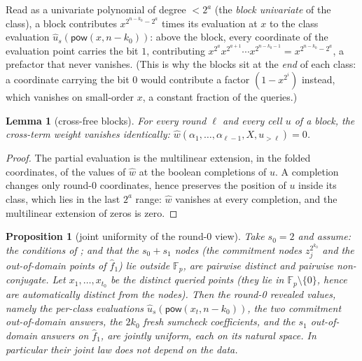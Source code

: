 \documentclass{article}
\newcommand{\Fp}{\mathbb{F}_p}
\newcommand{\pow}{\mathsf{pow}}
\newtheorem{lemma}[theorem]{Lemma}
\newtheorem{proposition}[theorem]{Proposition}
\theoremstyle{definition}
\begin{document}
Read as a univariate polynomial of degree $< 2^a$ (the \emph{block univariate} of the class), a block contributes $x^{2^{n - k_0} - 2^a}$ times its evaluation at $x$ to the class evaluation $\hat{u}_s(\pow(x, n - k_0))$: above the block, every coordinate of the evaluation point carries the bit $1$, contributing $x^{2^a} x^{2^{a+1}} \cdots x^{2^{n - k_0 - 1}} = x^{2^{n - k_0} - 2^a}$, a prefactor that never vanishes. (This is why the blocks sit at the \emph{end} of each class: a coordinate carrying the bit $0$ would contribute a factor $(1 - x^{2^i})$ instead, which vanishes on small-order $x$, a constant fraction of the queries.)

\begin{lemma}[cross-free blocks]\label{lem:blocks}
For every round $\ell$ and every cell $u$ of a block, the cross-term weight vanishes identically: $\hat{w}(\alpha_1, \dots, \alpha_{\ell-1}, X, u_{>\ell}) = 0$.
\end{lemma}

\begin{proof}
The partial evaluation is the multilinear extension, in the folded coordinates, of the values of $\hat{w}$ at the boolean completions of $u$. A completion changes only round-0 coordinates, hence preserves the position of $u$ inside its class, which lies in the last $2^a$ range: $\hat{w}$ vanishes at every completion, and the multilinear extension of zeros is zero.
\end{proof}

\begin{proposition}[joint uniformity of the round-0 view]\label{prop:uniform}
Take $s_0 = 2$ and assume: the conditions of ; and that the $s_0 + s_1$ nodes (the commitment nodes $z_j^{2^{k_0}}$ and the out-of-domain points of $\hat{f}_1$) lie outside $\Fp$, are pairwise distinct and pairwise non-conjugate. Let $x_1, \dots, x_{t_0}$ be the distinct queried points (they lie in $\Fp \setminus \{0\}$, hence are automatically distinct from the nodes). Then the round-0 revealed values, namely the per-class evaluations $\hat{u}_s(\pow(x_t, n - k_0))$, the two commitment out-of-domain answers, the $2k_0$ fresh sumcheck coefficients, and the $s_1$ out-of-domain answers on $\hat{f}_1$, are jointly uniform, each on its natural space. In particular their joint law does not depend on the data.
\end{proposition}
\end{document}
